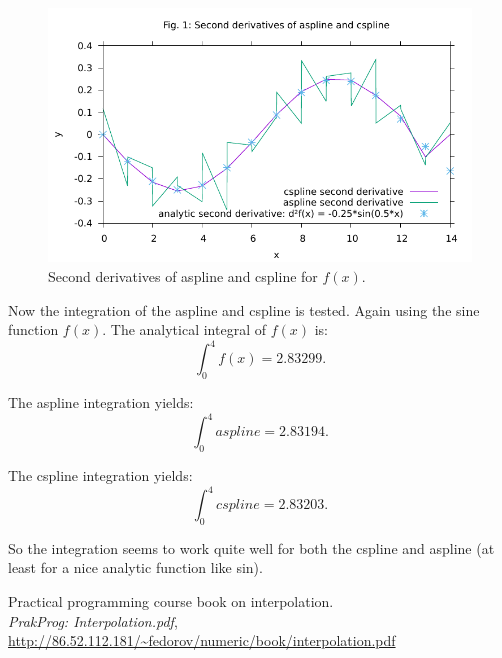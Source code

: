 \documentclass{article}
\begin{document}
\begin{figure}[h]
\label{fig:d}
\includegraphics[width=\linewidth]{dsplines2.pdf}
\caption{Second derivatives of aspline and cspline for $f(x)$.}
\end{figure} 

Now the integration of the aspline and cspline is tested. Again using the sine function $f(x)$.
The analytical integral of $f(x)$ is:
\begin{equation}
\int_0^4 f(x) = 2.83299. 
\end{equation}

The aspline integration  yields:
\begin{equation}
\int_0^4 aspline = 2.83194. 
\end{equation}

The cspline integration  yields:
\begin{equation}
\int_0^4 cspline = 2.83203. 
\end{equation}

So the integration seems to work quite well for both the cspline and aspline (at least for a nice analytic function like sin).

\clearpage
\begin{thebibliography}{99}
  Practical programming course book on interpolation.\\
  \emph{PrakProg: Interpolation.pdf},\\
 \url{http://86.52.112.181/~fedorov/numeric/book/interpolation.pdf}\\

\end{thebibliography}
\end{document}
